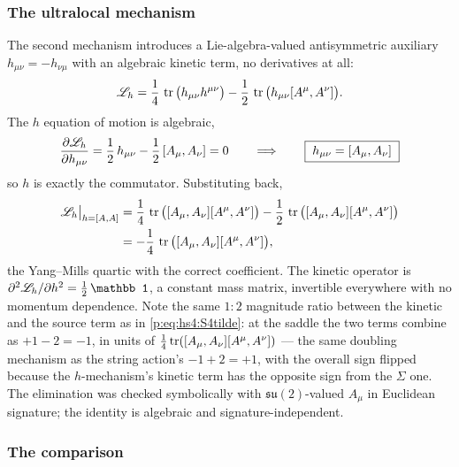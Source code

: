 \subsubsection{The ultralocal mechanism}
\label{pg:sec:ym:h}

The second mechanism introduces a Lie-algebra-valued antisymmetric auxiliary $h_{\mu\nu}=-h_{\nu\mu}$ with an algebraic kinetic term, no derivatives at all:
\begin{equation}
  \label{pg:eq:ym:Lh}
  \mathscr L_h
    = \frac14 \, \operatorname{tr}\big( h_{\mu\nu} h^{\mu\nu} \big)
      - \frac12 \, \operatorname{tr}\big( h_{\mu\nu} [A^\mu, A^\nu] \big).
\end{equation}
The $h$ equation of motion is algebraic,
\begin{equation}
  \frac{\partial \mathscr L_h}{\partial h_{\mu\nu}}
    = \frac12 \, h_{\mu\nu} - \frac12 \, [A_\mu, A_\nu]
    = 0
  \qquad\Longrightarrow\qquad
  \boxed{\; h_{\mu\nu} = [A_\mu, A_\nu] \;}
\end{equation}
so $h$ is exactly the commutator.
Substituting back,
\begin{equation}
  \begin{aligned}
    \mathscr L_h \big|_{h = [A, A]}
      &
      = \frac14 \, \operatorname{tr}\big( [A_\mu, A_\nu] [A^\mu, A^\nu] \big)
        - \frac12 \, \operatorname{tr}\big( [A_\mu, A_\nu] [A^\mu, A^\nu] \big)
    \\ &
      = - \frac14 \, \operatorname{tr}\big( [A_\mu, A_\nu] [A^\mu, A^\nu] \big),
  \end{aligned}
\end{equation}
the Yang--Mills quartic with the correct coefficient.
The kinetic operator is $\pd^2\mathscr L_h/\pd h^2=\frac12\,\mathbb 1$, a constant mass matrix, invertible everywhere with no momentum dependence.
Note the same $1:2$ magnitude ratio between the kinetic and the source term as in \eqref{p:eq:hs4:S4tilde}: at the saddle the two terms combine as $+1-2=-1$, in units of $\frac14\operatorname{tr}([A_\mu,A_\nu][A^\mu,A^\nu])$ --- the same doubling mechanism as the string action's $-1+2=+1$, with the overall sign flipped because the $h$-mechanism's kinetic term has the opposite sign from the $\Sigma$ one.
The elimination was checked symbolically with $\mathfrak{su}(2)$-valued $A_\mu$ in Euclidean signature; the identity is algebraic and signature-independent.

\subsubsection{The comparison}
\label{pg:sec:ym:compare}

